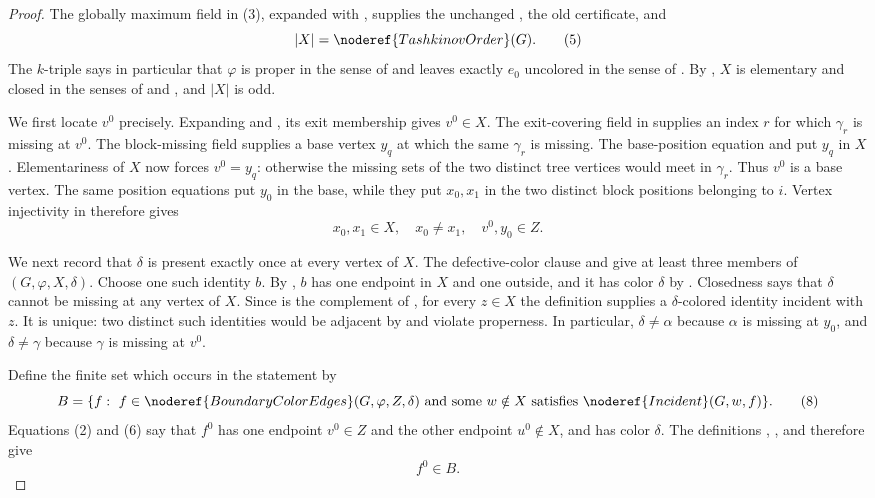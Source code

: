 \begin{proof}
The globally maximum field in (3), expanded with
, supplies the unchanged
, the old  certificate, and
\[
 |X|=\noderef{TashkinovOrder}(G).                             \tag{5}
\]
The $k$-triple says in particular that $\varphi$ is proper in the sense
of  and leaves exactly $e_0$ uncolored in
the sense of .  By
, $X$ is elementary and closed in the
senses of  and
, and $|X|$ is odd.

We first locate $v^0$ precisely.  Expanding
 and , its exit
membership gives $v^0\in X$.  The exit-covering field in
 supplies an index $r$ for which
$\gamma_r$ is missing at $v^0$.  The block-missing field supplies a base
vertex $y_q$ at which the same $\gamma_r$ is missing.  The base-position
equation and  put $y_q$ in $X$.
Elementariness of $X$ now forces $v^0=y_q$: otherwise the missing sets of
the two distinct tree vertices would meet in $\gamma_r$.  Thus $v^0$ is
a base vertex.  The same position equations put $y_0$ in the base, while
they put $x_0,x_1$ in the two distinct block positions belonging to $i$.
Vertex injectivity in  therefore gives
\[
 x_0,x_1\in X,\quad x_0\ne x_1,\quad
 v^0,y_0\in Z.                                               \tag{6}
\]

We next record that $\delta$ is present exactly once at every vertex of
$X$.  The defective-color clause and
 give at least three members
of $(G,\varphi,X,\delta)$.  Choose one such
identity $b$.  By , $b$ has one endpoint in $X$
and one outside, and it has color $\delta$ by
.  Closedness says that $\delta$ cannot be
missing at any vertex of $X$.  Since  is the
complement of , for every $z\in X$ the definition
 supplies a $\delta$-colored identity incident
with $z$.  It is unique: two distinct such identities would be adjacent
by  and violate properness.  In particular,
$\delta\ne\alpha$ because $\alpha$ is missing at $y_0$, and
$\delta\ne\gamma$ because $\gamma$ is missing at $v^0$.       

Define the finite set which occurs in the statement by
\[
 B=\{f:\ f\in\noderef{BoundaryColorEdges}(G,\varphi,Z,\delta)
       \text{ and some }w\notin X\text{ satisfies }
       \noderef{Incident}(G,w,f)\}.                           \tag{8}
\]
Equations (2) and (6) say that $f^0$ has one endpoint $v^0\in Z$ and the
other endpoint $u^0\notin X$, and has color $\delta$.  The definitions
, , and
 therefore give
\[
 f^0\in B.                                                   \tag{9}
\]


\end{proof}
